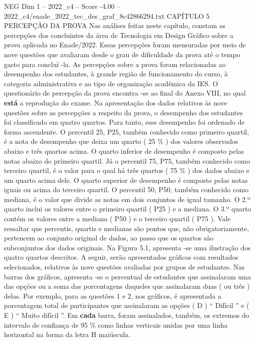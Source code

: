 \begin{textsample}{NEG Dim 1 – 2022\_c4 – Score -4.00 – 2022\_c4/enade\_2022\_tec\_des\_graf\_8c42866294.txt}  \label{ex:f1_neg_179}
CAPÍTULO 5 PERCEPÇÃO DA PROVA Nas análises feitas neste capítulo, constam as percepções dos concluintes da área de Tecnologia em Design Gráfico sobre a prova aplicada no Enade/2022.
Essas percepções foram mensuradas por meio de nove questões que avaliaram desde o grau de dificuldade da prova até o tempo gasto para concluí -la.
As percepções sobre a prova foram relacionadas ao desempenho dos estudantes, à grande região de funcionamento do curso, à categoria administrativa e ao tipo de organização acadêmica da IES.
O questionário de percepção da prova encontra -se ao final do Anexo VIII, no qual \textbf{está} a reprodução do exame.
Na apresentação dos dados relativos às nove questões sobre as percepções a respeito da prova, o desempenho dos estudantes foi classificado em quatro quartos.
Para tanto, esse desempenho foi ordenado de forma ascendente.
O percentil 25, P25, também conhecido como primeiro quartil, é a nota de desempenho que deixa um quarto ( 25 \% ) dos valores observados abaixo e três quartos acima.
O quarto inferior de desempenho é composto pelas notas abaixo do primeiro quartil.
Já o percentil 75, P75, também conhecido como terceiro quartil, é o valor para o qual há três quartos ( 75 \% ) dos dados abaixo e um quarto acima dele.
O quarto superior de desempenho é composto pelas notas iguais ou acima do terceiro quartil.
O percentil 50, P50, também conhecido como mediana, é o valor que divide as notas em dois conjuntos de igual tamanho.
O 2.º quarto inclui os valores entre o primeiro quartil ( P25 ) e a mediana.
O 3.º quarto contém os valores entre a mediana ( P50 ) e o terceiro quartil ( P75 ).
Vale ressaltar que percentis, quartis e medianas são pontos que, não obrigatoriamente, pertencem ao conjunto original de dados, ao passo que os quartos são subconjuntos dos dados originais.
Na Figura 5.1, apresenta -se uma ilustração dos quatro quartos descritos.
A seguir, serão apresentados gráficos com resultados selecionados, relativos às nove questões avaliadas por grupos de estudantes.
Nas barras dos gráficos, apresenta -se o percentual de estudantes que assinalaram uma das opções ou a soma das porcentagens daqueles que assinalaram duas ( ou três ) delas.
Por exemplo, para as questões 1 e 2, nos gráficos, é apresentada a porcentagem total de participantes que assinalaram as opções ( D ) “ Difícil ” e ( E ) “ Muito difícil ”.
Em \textbf{cada} barra, foram assinalados, também, os extremos do intervalo de confiança de 95 \% como linhas verticais unidas por uma linha horizontal na forma da letra H maiúscula.

\end{textsample}
